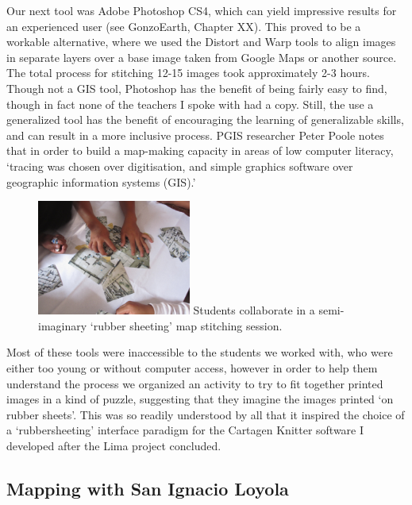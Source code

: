 \documentclass[11pt]{report}
\begin{document}
Our next tool was Adobe Photoshop CS4, which can yield impressive results for an experienced user (see GonzoEarth, Chapter XX). This proved to be a workable alternative, where we used the Distort and Warp tools to align images in separate layers over a base image taken from Google Maps or another source. The total process for stitching 12-15 images took approximately 2-3 hours. Though not a GIS tool, Photoshop has the benefit of being fairly easy to find, though in fact none of the teachers I spoke with had a copy. Still, the use a generalized tool has the benefit of encouraging the learning of generalizable skills, and can result in a more inclusive process. PGIS researcher Peter Poole notes that in order to build a map-making capacity in areas of low computer literacy, `tracing was chosen over digitisation, and simple graphics software over geographic information systems (GIS).' \cite{poole2006there}

\begin{figure}
	\begin{flushright}
		\includegraphics[width=0.45\textwidth]{images/juan-pablo-rubbersheeting.jpg}
		Students collaborate in a semi-imaginary `rubber sheeting' map stitching session. 
	\end{flushright}
\end{figure}

Most of these tools were inaccessible to the students we worked with, who were either too young or without computer access, however in order to help them understand the process we organized an activity to try to fit together printed images in a kind of puzzle, suggesting that they imagine the images printed `on rubber sheets'. This was so readily understood by all that it inspired the choice of a `rubbersheeting' interface paradigm for the Cartagen Knitter software I developed after the Lima project concluded. 

\subsection{Mapping with San Ignacio Loyola}
\end{document}
